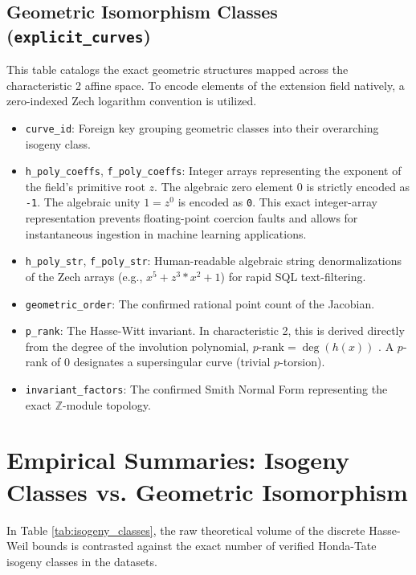 \documentclass[letterpaper, 11pt]{article}
\begin{document}
	\subsection{Geometric Isomorphism Classes (\texttt{explicit\_curves})}
	This table catalogs the exact geometric structures mapped across the characteristic 2 affine space. To encode elements of the extension field natively, a zero-indexed Zech logarithm convention is utilized.
	\begin{itemize}
		\item \texttt{curve\_id}: Foreign key grouping geometric classes into their overarching isogeny class.
		\item \texttt{h\_poly\_coeffs}, \texttt{f\_poly\_coeffs}: Integer arrays representing the exponent of the field's primitive root $z$. The algebraic zero element $0$ is strictly encoded as \texttt{-1}. The algebraic unity $1 = z^0$ is encoded as \texttt{0}. This exact integer-array representation prevents floating-point coercion faults and allows for instantaneous ingestion in machine learning applications.
		\item \texttt{h\_poly\_str}, \texttt{f\_poly\_str}: Human-readable algebraic string denormalizations of the Zech arrays (e.g., $x^5 + z^3*x^2 + 1$) for rapid SQL text-filtering.
		\item \texttt{geometric\_order}: The confirmed rational point count of the Jacobian.
		\item \texttt{p\_rank}: The Hasse-Witt invariant. In characteristic 2, this is derived directly from the degree of the involution polynomial, $p\text{-rank} = \deg(h(x))$ \cite{Scholten2002, Manin1963}. A $p$-rank of 0 designates a supersingular curve (trivial $p$-torsion).
		\item \texttt{invariant\_factors}: The confirmed Smith Normal Form representing the exact $\mathbb{Z}$-module topology.
	\end{itemize}
	
	\section{Empirical Summaries: Isogeny Classes vs. Geometric Isomorphism}
	In Table \ref{tab:isogeny_classes}, the raw theoretical volume of the discrete Hasse-Weil bounds is contrasted against the exact number of verified Honda-Tate isogeny classes in the datasets.
	
\end{document}
